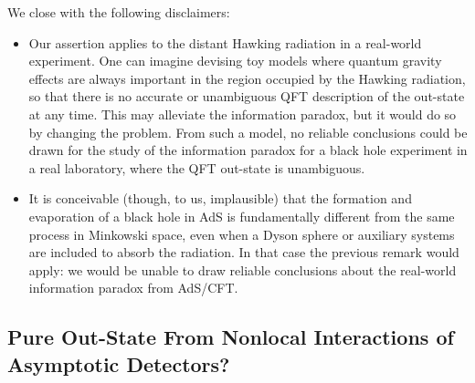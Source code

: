 \documentclass[12pt,letterpaper]{article}
\begin{document}
We close with the following disclaimers:
\begin{itemize}  
\item Our assertion applies to the distant Hawking radiation in a real-world experiment. One can imagine devising toy models where quantum gravity effects are always important in the region occupied by the Hawking radiation, so that there is no accurate or unambiguous QFT description of the out-state at any time. This may alleviate the information paradox, but it would do so by changing the problem. From such a model, no reliable conclusions could be drawn for the study of the information paradox for a black hole experiment in a real laboratory, where the QFT out-state is unambiguous.
\item It is conceivable (though, to us, implausible) that the formation and evaporation of a black hole in AdS is fundamentally different from the same process in Minkowski space, even when a Dyson sphere or auxiliary systems are included to absorb the radiation. In that case the previous remark would apply: we would be unable to draw reliable conclusions about the real-world information paradox from AdS/CFT.
\end{itemize} 





\subsection{Pure Out-State From Nonlocal Interactions of Asymptotic Detectors?}
\label{sec-dual}
\end{document}
